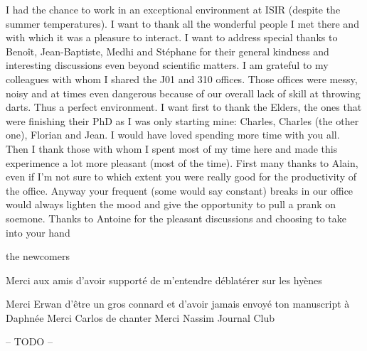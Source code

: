 I had the chance to work in an exceptional environment at ISIR (despite the summer temperatures). I want to thank all the wonderful people I met there and with which it was a pleasure to interact. I want to address special thanks to Benoît, Jean-Baptiste, Medhi and Stéphane for their general kindness and interesting discussions even beyond scientific matters. I am grateful to my colleagues with whom I shared the J01 and 310 offices. Those offices were messy, noisy and at times even dangerous because of our overall lack of skill at throwing darts. Thus a perfect environment. I want first to thank the Elders, the ones that were finishing their PhD as I was only starting mine: Charles, Charles (the other one), Florian and Jean. I would have loved spending more time with you all. Then I thank those with whom I spent most of my time here and made this experimence a lot more pleasant (most of the time). First many thanks to Alain, even if I'm not sure to which extent you were really good for the productivity of the office. Anyway your frequent (some would say constant) breaks in our office would always lighten the mood and give the opportunity to pull a prank on soemone. Thanks to Antoine for the pleasant discussions and choosing to take into your hand 

the newcomers

Merci aux amis d'avoir supporté de m'entendre déblatérer sur les hyènes

Merci Erwan d'être un gros connard et d'avoir jamais envoyé ton manuscript à Daphnée
Merci Carlos de chanter
Merci Nassim Journal Club



-- TODO --
